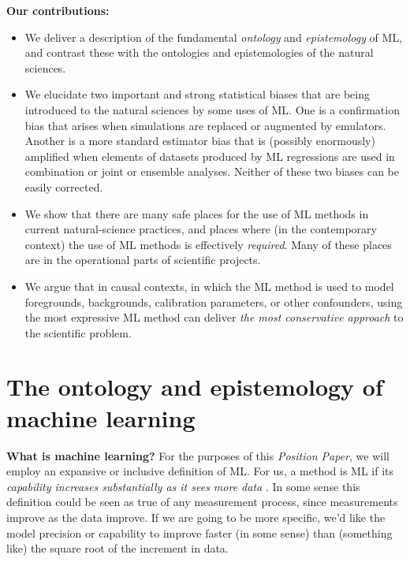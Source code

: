 \documentclass{article}
\newcommand{\documentname}{\textsl{Position Paper}}
\renewcommand{\paragraph}[1]{\noindent\par\textbf{#1}}
\begin{document}
\paragraph{Our contributions:}
\vspace{-1ex}\begin{itemize}
  \item We deliver a description of the fundamental \emph{ontology} and \emph{epistemology} of ML, and contrast these with the ontologies and epistemologies of the natural sciences.
  \item We elucidate two important and strong statistical biases that are being introduced to the natural sciences by some uses of ML. One is a confirmation bias that arises when simulations are replaced or augmented by emulators. Another is a more standard estimator bias that is (possibly enormously) amplified when elements of datasets produced by ML regressions are used in combination or joint or ensemble analyses. Neither of these two biases can be easily corrected.
  \item We show that there are many safe places for the use of ML methods in current natural-science practices, and places where (in the contemporary context) the use of ML methods is effectively \emph{required}. Many of these places are in the operational parts of scientific projects.
  \item We argue that in causal contexts, in which the ML method is used to model foregrounds, backgrounds, calibration parameters, or other confounders, using the most expressive ML method can deliver \emph{the most conservative approach} to the scientific problem.
\end{itemize}

\section{The ontology and epistemology of machine learning}\label{sec:philosophy}

\paragraph{What is machine learning?}
For the purposes of this \documentname, we will employ an expansive or inclusive definition of ML.
For us, a method is ML if its \emph{capability increases substantially as it sees more data} \cite{ml_definition}.
In some sense this definition could be seen as true of any measurement process, since measurements improve as the data improve. 
If we are going to be more specific, we'd like the model precision or capability to improve faster (in some sense) than (something like) the square root of the increment in data.
\end{document}
